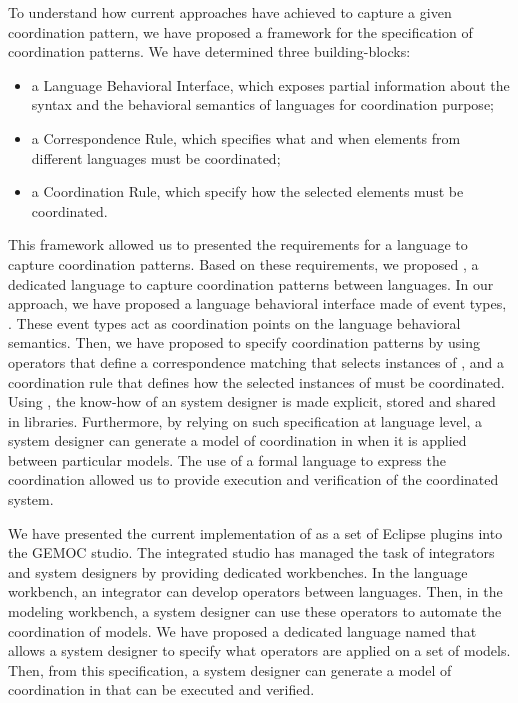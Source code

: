 To understand how current approaches have achieved to capture a given coordination pattern, we have proposed a framework for the specification of coordination patterns. We have determined three building-blocks: 
	\begin{itemize}
	\item a Language Behavioral Interface, which exposes partial information about the syntax and the behavioral semantics of languages for coordination purpose; 
	
	\item a Correspondence Rule, which specifies what and when elements from different languages must be coordinated;
	
	\item a Coordination Rule, which specify how the selected elements must be coordinated. 
\end{itemize}

This framework allowed us to presented the requirements for a language to capture coordination patterns. Based on these requirements, we proposed \bcool, a dedicated language to capture coordination patterns between languages. In our approach, we have proposed a language behavioral interface made of event types, \ie \dse. These event types act as coordination points on the language behavioral semantics. Then, we have proposed to specify coordination patterns by using operators that define a correspondence matching that selects instances of \dse, and a coordination rule that defines how the selected instances of \dse must be coordinated. Using \bcool, the know-how of an system designer is made explicit, stored and shared in libraries. Furthermore, by relying on such specification at language level, a system designer can generate a model of coordination in \ccsl when it is applied between particular models. The use of a formal language to express the coordination allowed us to provide execution and verification of the coordinated system.
	
We have presented the current implementation of \bcool as a set of Eclipse plugins into the GEMOC studio. The integrated studio has managed the task of integrators and system designers by providing dedicated workbenches. In the language workbench, an integrator can develop operators between languages. Then, in the modeling workbench, a system designer can use these operators to automate the coordination of models. We have proposed a dedicated language named \bflow that allows a system designer to specify what operators are applied on a set of models. Then, from this specification, a system designer can generate a model of coordination in \ccsl that can be executed and verified.  
	
